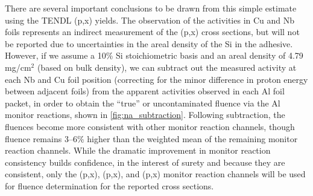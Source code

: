There are several important  conclusions to be drawn from this simple estimate using the TENDL   (p,x) yields.
The observation of the  activities in Cu and Nb foils  represents an indirect measurement of the (p,x) cross sections, but  will not be reported due to 
uncertainties in the areal density of the Si in the adhesive.
However, if we assume a 10\% Si stoichiometric basis and an areal density of 4.79\,mg/cm$^2$ (based on bulk density),
we can subtract out the measured  activity at each Nb and Cu foil position (correcting for the minor difference in proton energy between adjacent foils) from the apparent   activities observed in each Al foil packet, in order to obtain the \enquote{true} or uncontaminated fluence via the Al monitor reactions, shown  
in \autoref{fig:na_subtraction}.
Following subtraction, the  fluences become more consistent with other monitor reaction channels, 
though   fluence remains 3--6\% higher than the weighted mean of the remaining monitor reaction channels.
While the dramatic improvement in monitor reaction consistency builds confidence, in the interest of surety and because they are consistent, only the (p,x), (p,x), and (p,x) monitor reaction channels will be used for fluence determination for the reported cross sections.
